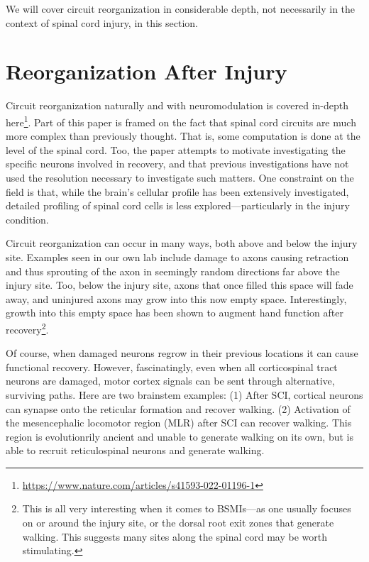 \documentclass[12pt]{report}
\begin{document}
We will cover circuit reorganization in considerable depth, not necessarily in the context of spinal cord injury, in this section. 

\section{Reorganization After Injury}


Circuit reorganization naturally and with neuromodulation is covered in-depth here\footnote{\url{https://www.nature.com/articles/s41593-022-01196-1}}. Part of this paper is framed on the fact that spinal cord circuits are much more complex than previously thought. That is, some computation is done at the level of the spinal cord. Too, the paper attempts to motivate investigating the specific neurons involved in recovery, and that previous investigations have not used the resolution necessary to investigate such matters. One constraint on the field is that, while the brain's cellular profile has been extensively investigated, detailed profiling of spinal cord cells is less explored---particularly in the injury condition.\newline

Circuit reorganization can occur in many ways, both above and below the injury site. Examples seen in our own lab include damage to axons causing retraction and thus sprouting of the axon in seemingly random directions far above the injury site. Too, below the injury site, axons that once filled this space will fade away, and uninjured axons may grow into this now empty space. Interestingly, growth into this empty space has been shown to augment hand function after recovery\footnote{This is all very interesting when it comes to BSMIs---as one usually focuses on or around the injury site, or the dorsal root exit zones that generate walking. This suggests many sites along the spinal cord may be worth stimulating.}.\newline

Of course, when damaged neurons regrow in their previous locations it can cause functional recovery. However, fascinatingly, even when all corticospinal tract neurons are damaged, motor cortex signals can be sent through alternative, surviving paths. Here are two brainstem examples: (1) After SCI, cortical neurons can synapse onto the reticular formation and recover walking. (2) Activation of the mesencephalic locomotor region (MLR) after SCI can recover walking. This region is evolutionrily ancient and unable to generate walking on its own, but is able to recruit reticulospinal neurons and generate walking.\newline
\end{document}
